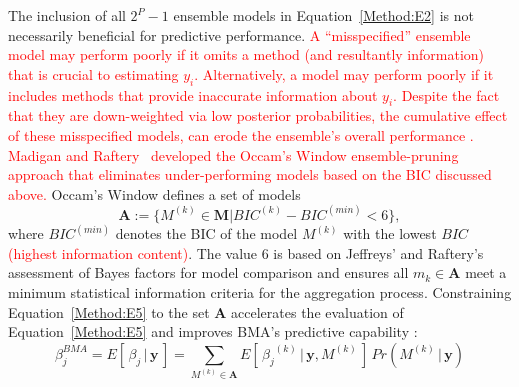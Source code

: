 \documentclass[journal=jpcbfk, manuscript=article]{achemso}
\newcommand{\+}[1]{\ensuremath{\mathbf{#1}}}
\newcommand{\rev}[1]{\textsf{\textcolor{red}{#1}}}
\begin{document}
The inclusion of all $2^P-1$ ensemble models in Equation~\ref{Method:E2} is not necessarily beneficial for predictive performance.
\rev{A ``misspecified'' ensemble model may perform poorly if it omits a method (and resultantly information) that is crucial to estimating $y_i$.
Alternatively, a model may perform poorly if it includes methods that provide inaccurate information about $y_i$.
Despite the fact that they are down-weighted via low posterior probabilities, the cumulative effect of these misspecified models, can erode the ensemble's overall performance \cite{Qian:2015, Martinez-Munoz:2009, Raftery:1998, Onorante:2014, Madigan:1994, Hoeting:1999, Morales-Casique:2010}.
Madigan and Raftery~\cite{Madigan:1994} developed the Occam's Window ensemble-pruning approach that eliminates under-performing models based on the BIC discussed above.}
Occam's Window defines a set of models
\begin{equation} \label{Method:E5}
	\textbf{A} := \{M^{(k)} \in \textbf{M} | BIC^{(k)} - BIC^{(min)} < 6\},
\end{equation}
where $BIC^{(min)}$ denotes the BIC of the model $M^{(k)}$ with the lowest $BIC$ \rev{(highest information content)}.
The value 6 is based on Jeffreys' \cite{Jefferys:1961} and Raftery's \cite{Raftery:1995} assessment of Bayes factors for model comparison and ensures all $m_k \in \mathbf{A}$ meet a minimum statistical information criteria for the aggregation process.
Constraining Equation~\ref{Method:E5} to the set $\+A$ accelerates the evaluation of Equation~\ref{Method:E5} and improves BMA's predictive capability \cite{Raftery:1998, Madigan:1994}:
\begin{equation} \label{Method:E6}
	\beta^{BMA}_j =  E[\,\beta_j \,|\, \+y\,] = \sum_{M^{(k)}\in \mathbf{A}} E[\,{\beta_j}^{(k)} \,|\, \+y,M^{(k)}\,] \,Pr(M^{(k)} \,|\, \textbf{y})
\end{equation}
\end{document}
